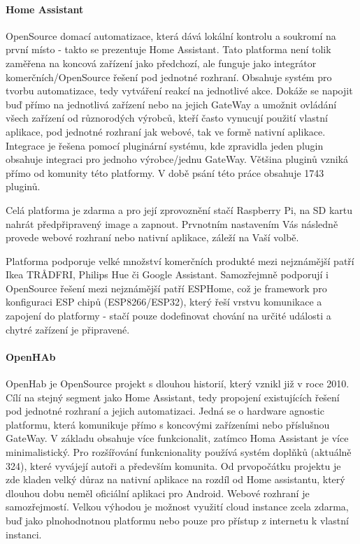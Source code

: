 \documentclass[thesis=B,czech]{FITthesis}[2019/12/23]
\begin{document}
\paragraph{Home Assistant}
OpenSource domací automatizace, která dává lokální kontrolu a soukromí na první místo - takto se prezentuje Home Assistant. Tato platforma není tolik zaměřena na koncová zařízení jako předchozí, ale funguje jako integrátor komerčních/OpenSource řešení pod jednotné rozhraní. Obsahuje systém pro tvorbu automatizace, tedy vytváření reakcí na jednotlivé akce. Dokáže se napojit buď přímo na jednotlivá zařízení nebo na jejich GateWay a umožnit ovládání všech zařízení od různorodých výrobců, kteří často vynucují použití vlastní aplikace, pod jednotné rozhraní jak webové, tak ve formě nativní aplikace. Integrace je řešena pomocí pluginární systému, kde zpravidla jeden plugin obsahuje integraci pro jednoho výrobce/jednu GateWay. Většina pluginů vzniká přímo od komunity této platformy. V době psání této práce obsahuje 1743 pluginů.

Celá platforma je zdarma a pro její zprovoznění stačí Raspberry Pi, na SD kartu nahrát předpřipravený image a zapnout. Prvnotním nastavením Vás následně provede webové rozhraní nebo nativní aplikace, záleží na Vaší volbě.

Platforma podporuje velké množství komerčních produkté mezi nejznámější patří Ikea TRÅDFRI, Philips Hue či Google Assistant. Samozřejmně podporují i OpenSource řešení mezi nejznámější patří ESPHome, což je framework pro konfiguraci ESP chipů (ESP8266/ESP32), který řeší vrstvu komunikace a zapojení do platformy - stačí pouze dodefinovat chování na určité události a chytré zařízení je připravené.

\paragraph{OpenHAb}
OpenHab je OpenSource projekt s dlouhou historií, který vznikl již v roce 2010. Cílí na stejný segment jako Home Assistant, tedy  propojení existujících řešení pod jednotné rozhraní a jejich automatizaci. Jedná se o hardware agnostic platformu, která komunikuje přímo s koncovými zařízeními nebo příslušnou GateWay. V základu obsahuje více funkcionalit, zatímco Homa Assistant je více minimalistický. Pro rozšířování funkcnionality používá systém doplňků (aktuálně 324), které vyvájejí autoři a především komunita. Od prvopočátku projektu je zde kladen velký důraz na nativní aplikace na rozdíl od Home assistantu, který dlouhou dobu neměl oficiální aplikaci pro Android. Webové rozhraní je samozřejmostí. Velkou výhodou je možnost využití cloud instance zcela zdarma, buď jako plnohodnotnou platformu nebo pouze pro přístup z internetu k vlastní instanci.
\end{document}
